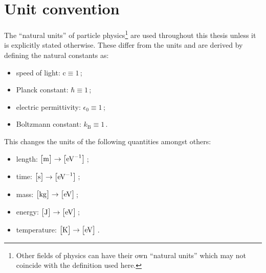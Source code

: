 \section*{Unit convention}

The ``natural units'' of particle physics\footnote{Other fields of physics can have their own ``natural units'' which may not coincide with the definition used here.} are used throughout this thesis unless it is explicitly stated otherwise. These differ from the  units and are derived by defining the natural constants as:

\begin{itemize}
\item speed of light: $\mathrm{c}\equiv 1$\,;
\item Planck constant: $\hbar\equiv 1$\,;
\item electric permittivity: $\epsilon_{0}\equiv 1$\,;
\item Boltzmann constant: $k_\mathrm{B}\equiv 1$\,.
\end{itemize}

This changes the units of the following quantities amongst others:

\begin{itemize}
\item length: $\big[\mathrm{m}\big]\rightarrow \big[\textrm{eV}^{-1}\big]$\,;
\item time: $\big[\mathrm{s}\big]\rightarrow \big[\textrm{eV}^{-1}\big]$\,;
\item mass: $\big[\mathrm{kg}\big]\rightarrow \big[\textrm{eV}\big]$\,;
\item energy: $\big[\mathrm{J}\big]\rightarrow \big[\textrm{eV}\big]$\,;
\item temperature: $\big[\mathrm{K}\big]\rightarrow \big[\textrm{eV}\big]$\,.
\end{itemize}



